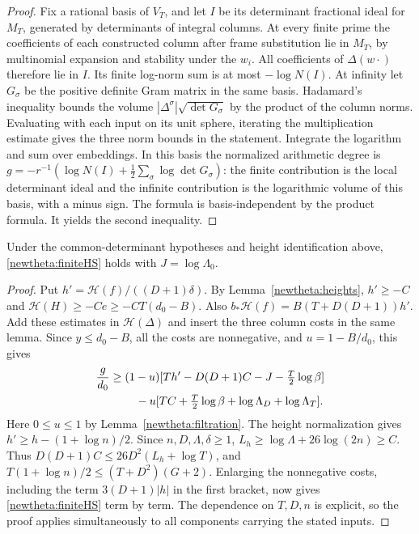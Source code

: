 \begin{proof}
Fix a rational basis of \(V_T\), and let \(I\) be its determinant
fractional ideal for \(M_T\), generated by determinants of integral
columns. At every finite prime the coefficients of each constructed
column after frame substitution lie in \(M_T\), by multinomial expansion
and stability under the \(w_i\). All coefficients of \(\Delta(w\cdot)\)
therefore lie in \(I\). Its finite log-norm sum is at most
\(-\log N(I)\). At infinity let \(G_\sigma\) be the positive definite
Gram matrix in the same basis. Hadamard's inequality bounds the volume
\(|\Delta^\sigma|\sqrt{\det G_\sigma}\) by the product of the column
norms. Evaluating with each input on its unit sphere, iterating the
multiplication estimate gives the three norm bounds in the statement.
Integrate the logarithm and sum over embeddings. In this basis the
normalized arithmetic degree is
\(g=-r^{-1}(\log N(I)+\tfrac12\sum_\sigma\log\det G_\sigma)\):
the finite contribution is the local determinant ideal and the infinite
contribution is the logarithmic volume of this basis, with a minus
sign. The formula is basis-independent by the product formula. It
yields the second inequality.
\end{proof}

\begin{corollary}\label{newtheta:effective}
Under the common-determinant hypotheses and height identification above,
\eqref{newtheta:finiteHS} holds with \(J=\log\Lambda_0\).
\end{corollary}
\begin{proof}
Put \(h'=\mathcal H(f)/((D+1)\delta)\). By
Lemma~\ref{newtheta:heights}, \(h'\ge-C\) and
\(\mathcal H(H)\ge-Ce\ge-CT(d_0-B)\).
Also \(b_*\mathcal H(f)=B(T+D(D+1))h'\).
Add these estimates in \(\mathcal H(\Delta)\) and insert the
three column costs in the same lemma. Since \(y\le d_0-B\), all
the costs are nonnegative, and \(u=1-B/d_0\), this gives
\begin{align*}
 \frac{g}{d_0}&\ge(1-u)
 [Th'-D(D+1)C-J-\tfrac T2\log\beta]\\
 &\hspace{8mm}-u[TC+\tfrac T2\log\beta
                        +\log\Lambda_D+\log\Lambda_T].
\end{align*}
Here \(0\le u\le1\) by Lemma~\ref{newtheta:filtration}.
The height normalization gives \(h'\ge h-(1+\log n)/2\).
Since \(n,D,\Lambda,\delta\ge1\),
\(L_h\ge\log\Lambda+26\log(2n)\ge C\).
Thus \(D(D+1)C\le26D^2(L_h+\log T)\), and
\(T(1+\log n)/2\le(T+D^2)(G+2)\).
Enlarging the nonnegative costs, including the term
\(3(D+1)|h|\) in the first bracket, now gives
\eqref{newtheta:finiteHS} term by term. The dependence on \(T,D,n\)
is explicit, so the proof applies simultaneously to all components
carrying the stated inputs.
\end{proof}

